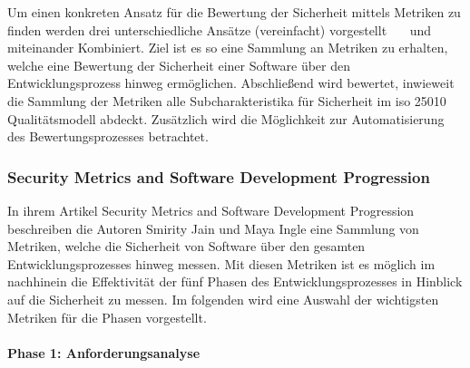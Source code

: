 \documentclass[12pt, a4paper, ngerman]{article}
\begin{document}
Um einen konkreten Ansatz für die Bewertung der Sicherheit mittels Metriken zu finden werden 
drei unterschiedliche Ansätze (vereinfacht) vorgestellt~\cite{Jain2014SecurityMA}~\cite{Chowdhury_Chan_Zulkernine_2008}~\cite{Wang_Wang_Guo_Xia_2009} und 
miteinander Kombiniert.
Ziel ist es so eine Sammlung an Metriken zu erhalten, 
welche eine Bewertung der Sicherheit einer Software über den Entwicklungsprozess hinweg ermöglichen. 
Abschließend wird bewertet, inwieweit die Sammlung der Metriken alle Subcharakteristika für Sicherheit im \ac{iso} 25010 Qualitätsmodell abdeckt.
Zusätzlich wird die Möglichkeit zur Automatisierung des Bewertungsprozesses betrachtet.

\subsubsection{Security Metrics and Software Development Progression~\cite{Jain2014SecurityMA}}

In ihrem Artikel Security Metrics and Software Development Progression beschreiben die Autoren Smirity Jain und Maya Ingle eine Sammlung von Metriken, 
welche die Sicherheit von Software über den gesamten Entwicklungsprozesses hinweg messen.
Mit diesen Metriken ist es möglich im nachhinein die Effektivität der fünf Phasen des Entwicklungsprozesses in Hinblick auf die Sicherheit zu messen.
Im folgenden wird eine Auswahl der wichtigsten Metriken für die Phasen vorgestellt.

\paragraph{Phase 1: Anforderungsanalyse}
\end{document}
